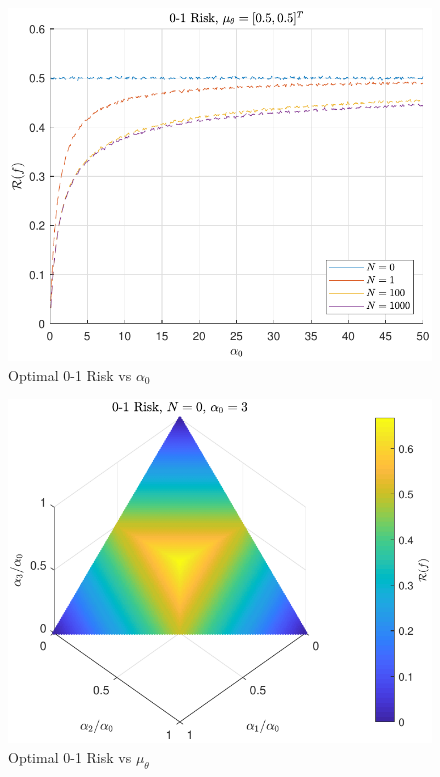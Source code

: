 \documentclass[12pt]{report}
\begin{document}
\begin{figure}
\centering
\includegraphics[scale=1.0]{Risk_01_Dir_alpha0.pdf}
\caption{Optimal 0-1 Risk vs $\alpha_0$}
\label{fig:Risk_01_Dir_alpha0}
\end{figure}

\begin{figure}
\centering
\includegraphics[scale=1.0]{Risk_01_Dir_muTheta_N_0_a0_3.pdf}
\caption{Optimal 0-1 Risk vs $\mu_{\theta}$}
\label{fig:Risk_01_Dir_muTheta_N_0_a0_3}
\end{figure}
\end{document}
